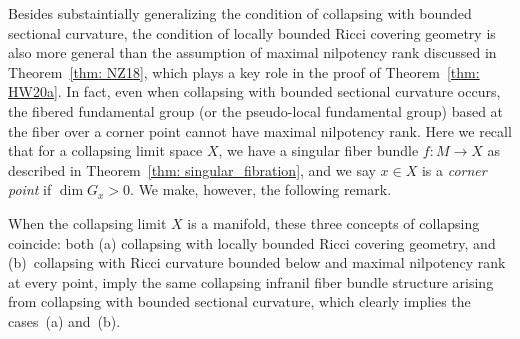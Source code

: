 \documentclass[pdftex]{sigma}
\numberwithin{equation}{section}
\begin{document}
Besides substaintially generalizing the condition of collapsing with bounded
sectional curvature, the condition of locally bounded Ricci covering geometry is
also more general than the assumption of maximal nilpotency rank discussed in
Theorem~\ref{thm: NZ18}, which plays a key role in the proof of
Theorem~\ref{thm: HW20a}. In fact, even when collapsing with bounded sectional
curvature occurs, the fibered fundamental group (or the pseudo-local
fundamental group) based at the fiber over a corner point cannot have maximal
nilpotency rank. Here we recall that for a collapsing limit space $X$, we have a
singular fiber bundle $f\colon M\to X$ as described in Theorem~\ref{thm:
singular_fibration}, and we say $x\in X$ is a \emph{corner point} if $\dim
G_x>0$. We make, however, the following remark.
\begin{Remark}
When the collapsing limit $X$ is a manifold, these three concepts of collapsing
coincide: both (a) collapsing with locally bounded Ricci covering geometry, and
(b)~collapsing with Ricci curvature bounded below and maximal nilpotency rank at
every point, imply the same collapsing infranil fiber bundle structure arising
from collapsing with bounded sectional curvature, which clearly implies the cases~(a) and~(b).
\end{Remark}
\end{document}
